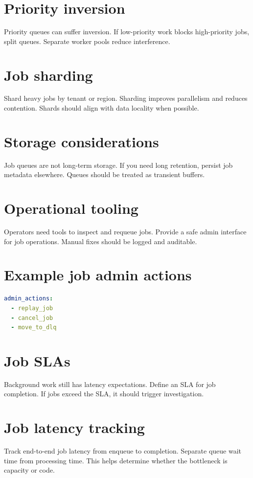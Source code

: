 \section{Priority inversion}
Priority queues can suffer inversion.
If low-priority work blocks high-priority jobs, split queues.
Separate worker pools reduce interference.

\section{Job sharding}
Shard heavy jobs by tenant or region.
Sharding improves parallelism and reduces contention.
Shards should align with data locality when possible.

\section{Storage considerations}
Job queues are not long-term storage.
If you need long retention, persist job metadata elsewhere.
Queues should be treated as transient buffers.

\section{Operational tooling}
Operators need tools to inspect and requeue jobs.
Provide a safe admin interface for job operations.
Manual fixes should be logged and auditable.

\section{Example job admin actions}
\begin{lstlisting}[language=YAML]
admin_actions:
  - replay_job
  - cancel_job
  - move_to_dlq
\end{lstlisting}

\section{Job SLAs}
Background work still has latency expectations.
Define an SLA for job completion.
If jobs exceed the SLA, it should trigger investigation.

\section{Job latency tracking}
Track end-to-end job latency from enqueue to completion.
Separate queue wait time from processing time.
This helps determine whether the bottleneck is capacity or code.

